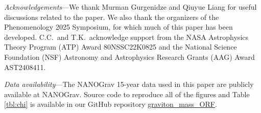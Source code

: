 \documentclass[prd,twocolumn,aps,psfig,nofootinbib,nobibnotes,superscriptaddress,preprintnumbers,times]{revtex4-2}
\begin{document}
\vspace{5mm}
\textit{Acknowledgements}---We thank Murman Gurgenidze and Qiuyue Liang for useful discussions related to the paper. We also thank the organizers of the Phenomenology 2025 Symposium, for which much of this paper has been developed. C.C.\ and T.K.\ acknowledge support from the NASA Astrophysics Theory Program (ATP) Award 80NSSC22K0825 and the National Science Foundation (NSF) Astronomy and Astrophysics Research Grants (AAG) Award AST2408411.

\vspace{5mm}
\textit{Data availability}---The NANOGrav 15-year data used in this paper are publicly available at NANOGrav. Source code to reproduce all of the figures and Table \ref{tbl:chi} is available in our GitHub repository \href{https://github.com/ChrisChoi314/graviton_mass_ORF}{graviton\_mass\_ORF}.




\appendix
\end{document}
